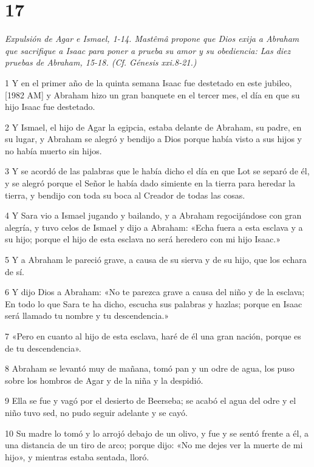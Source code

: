 \chapter{17}

\par \textit{Expulsión de Agar e Ismael, 1-14. Mastêmâ propone que Dios exija a Abraham que sacrifique a Isaac para poner a prueba su amor y su obediencia: Las diez pruebas de Abraham, 15-18. (Cf. Génesis xxi.8-21.)}

\par 1 Y en el primer año de la quinta semana Isaac fue destetado en este jubileo, [1982 AM] y Abraham hizo un gran banquete en el tercer mes, el día en que su hijo Isaac fue destetado.
\par 2 Y Ismael, el hijo de Agar la egipcia, estaba delante de Abraham, su padre, en su lugar, y Abraham se alegró y bendijo a Dios porque había visto a sus hijos y no había muerto sin hijos.
\par 3 Y se acordó de las palabras que le había dicho el día en que Lot se separó de él, y se alegró porque el Señor le había dado simiente en la tierra para heredar la tierra, y bendijo con toda su boca al Creador de todas las cosas.
\par 4 Y Sara vio a Ismael jugando y bailando, y a Abraham regocijándose con gran alegría, y tuvo celos de Ismael y dijo a Abraham: «Echa fuera a esta esclava y a su hijo; porque el hijo de esta esclava no será heredero con mi hijo Isaac.»
\par 5 Y a Abraham le pareció grave, a causa de su sierva y de su hijo, que los echara de sí.
\par 6 Y dijo Dios a Abraham: «No te parezca grave a causa del niño y de la esclava; En todo lo que Sara te ha dicho, escucha sus palabras y hazlas; porque en Isaac será llamado tu nombre y tu descendencia.»
\par 7 «Pero en cuanto al hijo de esta esclava, haré de él una gran nación, porque es de tu descendencia».
\par 8 Abraham se levantó muy de mañana, tomó pan y un odre de agua, los puso sobre los hombros de Agar y de la niña y la despidió.
\par 9 Ella se fue y vagó por el desierto de Beerseba; se acabó el agua del odre y el niño tuvo sed, no pudo seguir adelante y se cayó.
\par 10 Su madre lo tomó y lo arrojó debajo de un olivo, y fue y se sentó frente a él, a una distancia de un tiro de arco; porque dijo: «No me dejes ver la muerte de mi hijo», y mientras estaba sentada, lloró.
